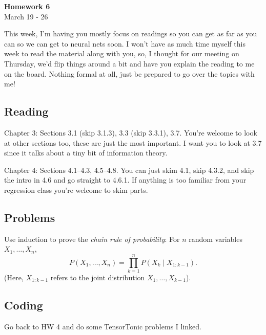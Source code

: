 \documentclass{article}
\newenvironment{envsection}[1]{\begin{trivlist}
\item[\hskip \labelsep {\bfseries #1}]}{\end{trivlist}}
\begin{document}
\setlength{\abovedisplayskip}{4pt}
\setlength{\belowdisplayskip}{4pt}


\begin{center}
    \Large{\textbf{Homework 6}}\\
    \normalsize March 19 - 26
\end{center}
\vspace{10pt}

\noindent This week, I'm having you mostly focus on readings so you can get as far as you can so we can get to neural nets soon. I won't have as much time myself this week to read the material along with you, so, I thought for our meeting on Thursday, we'd flip things around a bit and have you explain the reading to me on the board. Nothing formal at all, just be prepared to go over the topics with me!

\subsection*{Reading}

\begin{envsection}{1. S+L Processing:}
    Chapter 3: Sections 3.1 (skip 3.1.3), 3.3 (skip 3.3.1), 3.7. You're welcome to look at other sections too, these are just the most important. I want you to look at 3.7 since it talks about a tiny bit of information theory.
\end{envsection}

\begin{envsection}{2. S+L Processing:}
    Chapter 4: Sections 4.1--4.3, 4.5--4.8. You can just skim 4.1, skip 4.3.2, and skip the intro in 4.6 and go straight to 4.6.1. If anything is too familiar from your regression class you're welcome to skim parts.
\end{envsection}

\subsection*{Problems}

\begin{envsection}{Problem 1.}
    Use induction to prove the \textit{chain rule of probability}: For $n$ random variables $X_1,\dots,X_n$,
    \[
    P(X_1,\dots,X_n) = \prod_{k=1}^{n} P(X_k \mid X_{1:k-1}).
    \]
    (Here, $X_{1:k-1}$ refers to the joint distribution $X_1,\dots,X_{k-1}$).
\end{envsection}

\subsection*{Coding}

\begin{envsection}{1.}
    Go back to HW 4 and do some TensorTonic problems I linked.
\end{envsection}
\end{document}

